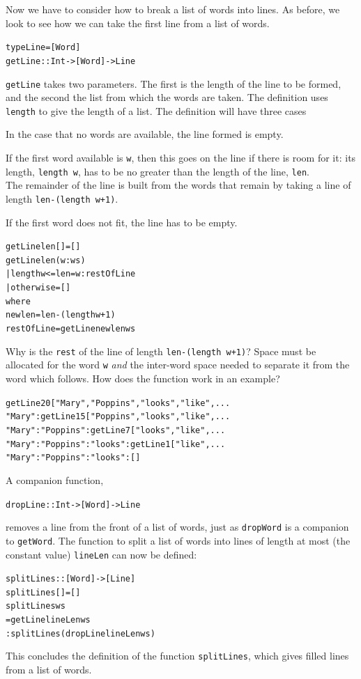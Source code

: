 Now we have to consider how to break a list of words into lines. As before,
we look to see how we can take the first line from a list of words. 
\begin{alltt}
type Line = [Word]
getLine :: Int -> [Word] -> Line
\end{alltt}
\texttt{getLine} takes two parameters. The first is the length of the line to be
formed, and the second the list from which the words are taken. The definition 
uses \texttt{length} to give the length of a list.
The definition will have three cases
\begin{titemize}
\item In the case that no words are available, the line formed is empty.
\item If the first word available is \texttt{w}, then this goes on the line if
there is room for it: its length, \texttt{length w}, has to be no greater than the
length of the line, \texttt{len}.\\
 The remainder of the line is built from the 
words that remain by taking a
line of length  \texttt{len-(length w+1)}.
\item If the first word does not fit, the line has to be empty. 
\end{titemize}
\begin{alltt}
getLine len []     = []
getLine len (w:ws)
  | length w <= len     = w : restOfLine  
  | otherwise           = []
    where
    newlen      = len - (length w + 1)
    restOfLine  = getLine newlen ws
\end{alltt}
Why is the \texttt{rest} of the line of length \texttt{len-(length w+1)}? Space must
be allocated for the word \texttt{w} {\em and\/} the inter-word space needed to separate
it from the word which follows. How does the function work in an example?
\begin{alltt}
getLine 20 ["Mary","Poppins","looks","like",...
\step "Mary" : getLine 15 ["Poppins","looks","like",...
\step "Mary" : "Poppins" : getLine 7 ["looks","like",...
\step "Mary" : "Poppins" : "looks" : getLine 1 ["like",...
\step "Mary" : "Poppins" : "looks" : []
\end{alltt}
A companion function,
\begin{alltt}
dropLine :: Int -> [Word] -> Line
\end{alltt}
removes a line from the front of a list of words, just as \texttt{dropWord} is a
companion to \texttt{getWord}. The function to split a list of words
into lines of length at most (the constant value) \texttt{lineLen} can now be defined:
\begin{alltt}
splitLines :: [Word] -> [Line]
splitLines [] = []
splitLines ws
  = getLine lineLen ws
         : splitLines (dropLine lineLen ws)
\end{alltt}
This concludes the definition of the function \texttt{splitLines}, which gives
filled lines from a list of words. 

